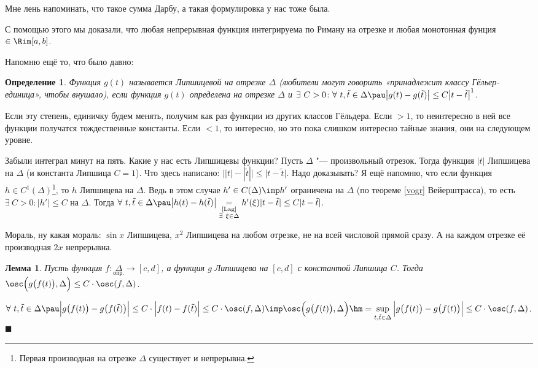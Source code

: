 \documentclass[a4paper,10pt,twoside]{article}
\newtheorem{Def}{Определение}[section]
\newtheorem{Th}{Лемма}[section]
\newenvironment{Proof}
       {\par\noindent{\textbf{Доказательство.}}}
       {\hfill$\scriptstyle\blacksquare$}
\begin{document}
 Мне лень напоминать, что такое сумма Дарбу, а такая формулировка у нас тоже была.
 
 С помощью этого мы доказали, что любая непрерывная функция интегрируема по Риману на отрезке и любая монотонная
 фунция $\in\Rim[a,b]$.
 
 Напомню ещё то, что было давно:
 
 \begin{Def}
 	Функция $g(t)$ называется Липшицевой на отрезке $\Delta$ (любители могут говорить «принадлежит классу Гёльер-единица», чтобы внушало),
 	если функция  $g(t)$ определена на отрезке $\Delta$ и $\exists\  C>0\colon \forall\  t,\tilde t\in\Delta\pau\big|g(t)-g(\tilde t)\big|\leq C\big|t-\tilde t\big|^1$. 
 \end{Def}
 
 Если эту степень,
 	единичку будем менять, получим как раз функции из других классов Гёльдера. Если $>1$, то неинтересно в ней все функции получатся тождественные константы. Если
 	$<1$, то интересно, но это пока слишком интересно\ldotst{} тайные знания, они на следующем уровне. 
 
 Забыли интеграл\ldotst{} минут на пять. Какие у нас есть Липшицевы функции? Пусть $\Delta$ "--- произвольный отрезок. Тогда функция $|t|$ Липшицева на $\Delta$
 (и константа Липшица $C=1$). Что здесь написано: $\big| |t|-|\tilde t|\big|\leq\big|t-\tilde t\big|$. Надо доказывать?
 Я ещё напомню, что если функция $h\in C^1(\Delta)$\footnote{Первая производная на отрезке $\Delta$ существует и непрерывна.}, то $h$ Липшицева на $\Delta$.
 Ведь в этом случае $h'\in C(\Delta)\imp h'$ ограничена на $\Delta$ (по теореме \ref{vogr} Вейерштрасса), то есть
 $\exists\  C>0\colon |h'|\leq C$ на $\Delta$. Тогда $\forall\  t,\tilde t\in\Delta\pau\big|h(t)-h(\tilde t)\big|\underset{\substack{\text{\ref{Lag}}\\ \exists\ \xi\in\Delta}}= 
 h'(\xi)|t-\tilde t|\leq C|t-\tilde t|$.
 
 Мораль, ну какая мораль: $\sin x$ Липшицева, $x^2$ Липшицева на любом отрезке, не на всей числовой прямой сразу. А на каждом отрезке её производная $2x$ непрерывна.
 
 \begin{Th}
 	Пусть функция $f\colon\underset{\text{опр.}}{\Delta}\to[c,d]$, а функция $g$ Липшицева на $[c,d]$ с константой Липшица $C$. Тогда $\osc\Big(g\big(f(t)\big),\Delta\Big)\leq
 	C\cdot\osc(f,\Delta)$.
 \end{Th}

 \begin{Proof}
 	$\forall\  t,\tilde t\in\Delta\pau\Big|g\big(f(t)\big)-g\big(f(\tilde t)\big)\Big|\leq C\cdot\Big|f(t)-f(\tilde t)\Big|\leq
 	C\cdot \osc(f,\Delta)\imp\osc\Big(g\big(f(t)\big),\Delta\Big)\hm=\sup\limits_{t,\tilde t\in\Delta}
 	\Big|g\big(f(t)\big)-g\big(f(t)\big)\Big|\leq C\cdot\osc(f,\Delta)$.
 \end{Proof}
 
\end{document}
